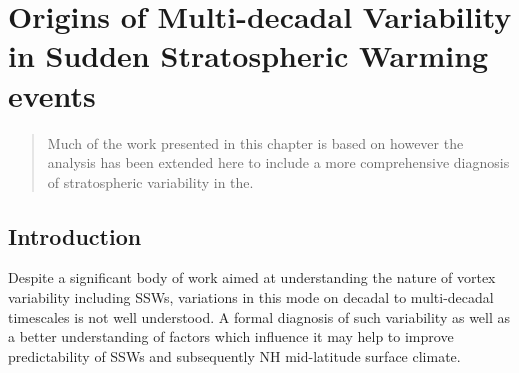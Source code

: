 \chapter{Origins of Multi-decadal Variability in Sudden Stratospheric Warming events}
\label{cha:models}
\begin{quotation}
  Much of the work presented in this chapter is based on \cite{dimdore-milesOrigins2020b} however the analysis has been extended here to include a more comprehensive diagnosis of stratospheric variability in the.
\end{quotation}


\section{Introduction}
\label{sec:origins_introduction}
Despite a significant body of work aimed at understanding the nature of vortex variability including SSWs, variations in this mode on decadal to multi-decadal timescales is not well understood. A formal diagnosis of such variability as well as a better understanding of factors which influence it may help to improve predictability of SSWs and subsequently NH mid-latitude surface climate.

